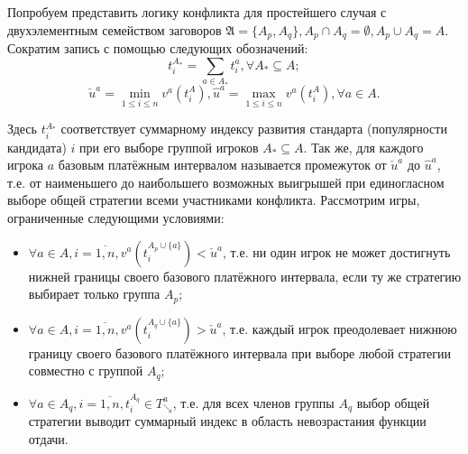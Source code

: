 Попробуем представить логику конфликта для простейшего случая с двухэлементным семейством заговоров $\mathfrak{A} = \{A_p, A_q\}, A_p \cap A_q = \emptyset, A_p \cup A_q = A$. Сократим запись с помощью следующих обозначений:
\begin{equation*}
	t_i^{A_*} = \sum_{a \in A_*} t_i^a, \forall A_* \subseteq A;
\end{equation*}
\begin{equation*}
	\check{u}^a = \min_{1 \le i \le n} v^a(t_i^A), \hat{u}^a = \max_{1 \le i \le n} v^a(t_i^A), \forall a \in A.
\end{equation*}

Здесь $t_i^{A_*}$ соответствует суммарному индексу развития стандарта (популярности кандидата) $i$ при его выборе группой игроков $A_* \subseteq A$. Так же, для каждого игрока $a$ базовым платёжным интервалом называется промежуток от $\check{u}^a$ до $\hat{u}^a$, т.е. от наименьшего до наибольшего возможных выигрышей при единогласном выборе общей стратегии всеми участниками конфликта. Рассмотрим игры, ограниченные следующими условиями:

\begin{itemize}
	\item $\forall a \in A, i = \overline{1,n}, v^a(t_i^{A_p \cup \{a\}}) < \check{u}^a$, т.е. ни один игрок не может достигнуть нижней границы своего базового платёжного интервала, если ту же стратегию выбирает только группа $A_p$;
	\item $\forall a \in A, i = \overline{1,n}, v^a(t_i^{A_q \cup \{a\}}) > \check{u}^a$, т.е. каждый игрок преодолевает нижнюю границу своего базового платёжного интервала при выборе любой стратегии совместно с группой $A_q$;
	\item $\forall a \in A_q, i = \overline{1,n}, t_i^{A_q} \in T^a_{\searrow}$, т.е. для всех членов группы $A_q$ выбор общей стратегии выводит суммарный индекс в область невозрастания функции отдачи.
\end{itemize}


